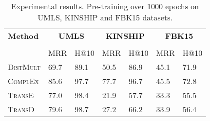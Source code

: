 \begin{table}[H]
    \centering
    \begin{tabular}{lllllll}
        \toprule
        \textbf{Method} &
        \multicolumn{2}{c}{\textbf{UMLS}} & 
        \multicolumn{2}{c}{\textbf{KINSHIP}} & 
        \multicolumn{2}{c}{\textbf{FBK15}}\\
        
        \cmidrule{2-6} \cmidrule{7-7} \\
        {} & MRR & H@10 & MRR & H@10 & MRR & H@10 \\
        
        \midrule

        \textsc{DistMult}  
        & 69.7 & 89.1 & 50.5 & 86.9 & 45.1 & 71.9\\
        
        \textsc{ComplEx}   
        & 85.6 & 97.7 & 77.7 & 96.7 & 45.5 & 72.8\\
        
        \textsc{TransE}    
        & 77.0 & 98.4 & 21.9 & 57.7 & 33.3 & 55.5 \\
        
        \textsc{TransD}    
        & 79.6 & 98.7 & 27.2 & 66.2 & 33.9 & 56.4 \\ 
        \bottomrule
    \end{tabular}
    \caption{Experimental results.
    Pre-training over 1000 epochs on \textsc{UMLS},
  \textsc{KINSHIP} and \textsc{FBK15} datasets.}
    \label{tab:result_table1_pretraining}
\end{table}



